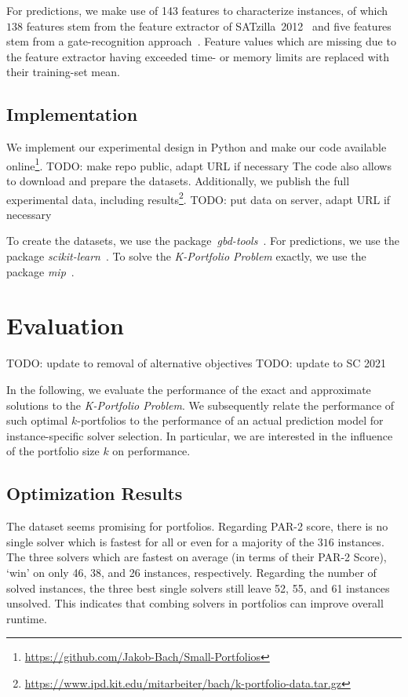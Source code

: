 \documentclass[conference]{IEEEtran}
\newcommand{\todo}[1]{{\color{red}TODO: #1}}
\begin{document}
For predictions, we make use of 143 features to characterize instances, of which 
$138$ features stem from the feature extractor of SATzilla~2012~\cite{xu2008satzilla, xu2012satzilla2012} and five features stem from a gate-recognition approach~\cite{Iser:2015:GateRecognition}. 
Feature values which are missing due to the feature extractor having exceeded time- or memory limits are replaced with their training-set mean. 

\subsection{Implementation}

We implement our experimental design in Python and make our code available online\footnote{\url{https://github.com/Jakob-Bach/Small-Portfolios}}.
\todo{make repo public, adapt URL if necessary}
The code also allows to download and prepare the datasets.
Additionally, we publish the full experimental data, including results\footnote{\url{https://www.ipd.kit.edu/mitarbeiter/bach/k-portfolio-data.tar.gz}}.
\todo{put data on server, adapt URL if necessary}

To create the datasets, we use the package~\emph{gbd-tools}~\cite{iser2020collaborative}.
For predictions, we use the package \emph{scikit-learn}~\cite{scikit-learn}.
To solve the \emph{K-Portfolio Problem} exactly, we use the package \emph{mip}~\cite{python-mip}.

\section{Evaluation}
\label{sec:evaluation}

\todo{update to removal of alternative objectives}
\todo{update to SC 2021}

In the following, we evaluate the performance of the exact and approximate solutions to the \emph{K-Portfolio Problem}. 
We subsequently relate the performance of such optimal $k$-portfolios to the performance of an actual prediction model for instance-specific solver selection. 
In particular, we are interested in the influence of the portfolio size $k$ on performance. 

\subsection{Optimization Results}

The dataset seems promising for portfolios.
Regarding \mbox{PAR-2} score, there is no single solver which is fastest for all or even for a majority of the $316$ instances. 
The three solvers which are fastest on average (in terms of their PAR-2 Score), `win' on only 46, 38, and 26 instances, respectively. 
Regarding the number of solved instances, the three best single solvers still leave 52, 55, and 61 instances unsolved. 
This indicates that combing solvers in portfolios can improve overall runtime.
\end{document}
